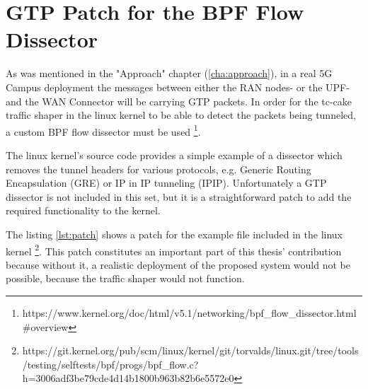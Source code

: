 

\cleardoublepage
\chapter{GTP Patch for the BPF Flow Dissector}
\label{appendix:patch}

As was mentioned in the "Approach" chapter (\ref{cha:approach}), in a real 5G Campus deployment the messages between either the RAN nodes- or the UPF- and the WAN Connector will be carrying GTP packets. In order for the tc-cake traffic shaper in the linux kernel to be able to detect the packets being tunneled, a custom BPF flow dissector must be used \footnote{https://www.kernel.org/doc/html/v5.1/networking/bpf\_flow\_dissector.html\#overview}.

The linux kernel's source code provides a simple example of a dissector which removes the tunnel headers for various protocols, e.g. Generic Routing Encapsulation (GRE) or IP in IP tunneling (IPIP). Unfortunately a GTP dissector is not included in this set, but it is a straightforward patch to add the required functionality to the kernel.

The listing \ref{lst:patch} shows a patch for the example file included in the linux kernel \footnote{https://git.kernel.org/pub/scm/linux/kernel/git/torvalds/linux.git/tree/tools/testing/selftests/bpf/progs/bpf\_flow.c?h=3006adf3be79cde4d14b1800b963b82b6e5572e0}. This patch constitutes an important part of this thesis' contribution because without it, a realistic deployment of the proposed system would not be possible, because the traffic shaper would not function.

\clearpage

